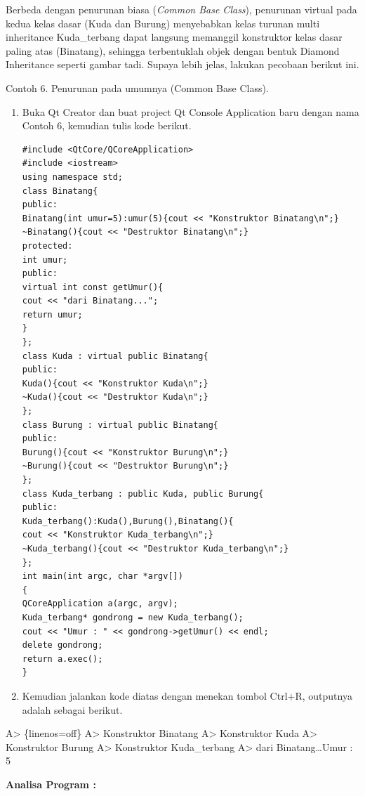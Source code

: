 Berbeda dengan penurunan biasa (\emph{Common Base Class}), penurunan
virtual pada kedua kelas dasar (Kuda dan Burung) menyebabkan kelas
turunan multi inheritance Kuda\_terbang dapat langsung memanggil
konstruktor kelas dasar paling atas (Binatang), sehingga terbentuklah
objek dengan bentuk Diamond Inheritance seperti gambar tadi. Supaya
lebih jelas, lakukan pecobaan berikut ini.

Contoh 6. Penurunan pada umumnya (Common Base Class).

\begin{enumerate}
\def\labelenumi{\arabic{enumi}.}
\item
  Buka Qt Creator dan buat project Qt Console Application baru dengan
  nama Contoh 6, kemudian tulis kode berikut.

\begin{verbatim}
#include <QtCore/QCoreApplication>
#include <iostream>
using namespace std;
class Binatang{
public:
Binatang(int umur=5):umur(5){cout << "Konstruktor Binatang\n";}
~Binatang(){cout << "Destruktor Binatang\n";}
protected:
int umur;
public:
virtual int const getUmur(){
cout << "dari Binatang...";
return umur;
}
};
class Kuda : virtual public Binatang{
public:
Kuda(){cout << "Konstruktor Kuda\n";}
~Kuda(){cout << "Destruktor Kuda\n";}
};
class Burung : virtual public Binatang{
public:
Burung(){cout << "Konstruktor Burung\n";}
~Burung(){cout << "Destruktor Burung\n";}
};
class Kuda_terbang : public Kuda, public Burung{
public:
Kuda_terbang():Kuda(),Burung(),Binatang(){
cout << "Konstruktor Kuda_terbang\n";}
~Kuda_terbang(){cout << "Destruktor Kuda_terbang\n";}
};
int main(int argc, char *argv[])
{
QCoreApplication a(argc, argv);
Kuda_terbang* gondrong = new Kuda_terbang();
cout << "Umur : " << gondrong->getUmur() << endl;
delete gondrong;
return a.exec();
}
\end{verbatim}
\item
  Kemudian jalankan kode diatas dengan menekan tombol Ctrl+R, outputnya
  adalah sebagai berikut.
\end{enumerate}

A\textgreater{} \{linenos=off\} A\textgreater{} Konstruktor Binatang
A\textgreater{} Konstruktor Kuda A\textgreater{} Konstruktor Burung
A\textgreater{} Konstruktor Kuda\_terbang A\textgreater{} dari
Binatang\ldots{}Umur : 5

\textbf{Analisa Program :}

